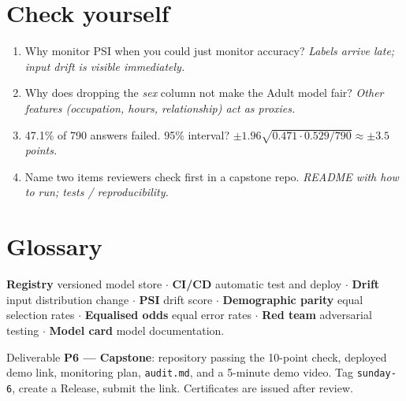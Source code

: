 \documentclass[11pt,a4paper]{article}
\begin{document}
\section*{Check yourself}
\begin{enumerate}
\item Why monitor PSI when you could just monitor accuracy? \emph{Labels arrive late; input drift is visible immediately.}
\item Why does dropping the \emph{sex} column not make the Adult model fair? \emph{Other features (occupation, hours, relationship) act as proxies.}
\item 47.1\% of 790 answers failed. 95\% interval? \emph{$\pm1.96\sqrt{0.471\cdot0.529/790}\approx\pm3.5$ points.}
\item Name two items reviewers check first in a capstone repo. \emph{README with how to run; tests / reproducibility.}
\end{enumerate}

\section*{Glossary}
\textbf{Registry} versioned model store $\cdot$ \textbf{CI/CD} automatic test and deploy $\cdot$ \textbf{Drift} input distribution change $\cdot$ \textbf{PSI} drift score $\cdot$ \textbf{Demographic parity} equal selection rates $\cdot$ \textbf{Equalised odds} equal error rates $\cdot$ \textbf{Red team} adversarial testing $\cdot$ \textbf{Model card} model documentation.

\begin{submitbox}
Deliverable \textbf{P6 --- Capstone}: repository passing the 10-point check, deployed demo link, monitoring plan, \texttt{audit.md}, and a 5-minute demo video. Tag \texttt{sunday-6}, create a Release, submit the link. Certificates are issued after review.
\end{submitbox}


\end{document}

